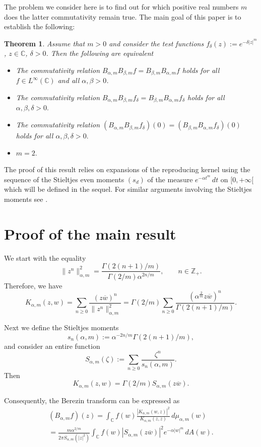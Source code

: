 \documentclass[12pt]{amsart}
\numberwithin{equation}{section}
\newtheorem*{thmA}{Theorem}
\theoremstyle{plain}
\numberwithin{equation}{section}
\begin{document}
 
The problem we consider here is to find out for which positive real numbers $m$ does the latter commutativity remain true.  The main goal of this paper is to establish the following:

\begin{thmA}\label{main}  Assume that $m>0$  and consider the test functions  $f_\delta(z):=e^{-\delta|z|^m}$, $z\in\mathbb C$, $\delta>0$. Then the following are equivalent
\begin{itemize}
\item[(1)] The commutativity  relation   $B_{\alpha,m}B_{\beta,m}f=B_{\beta,m}B_{\alpha,m}f$  holds for all $f\in L^{\infty}(\mathbb C)$ and  all $\alpha, \beta > 0$.
\item[(2)] The commutativity  relation   $B_{\alpha,m}B_{\beta,m}f_\delta =B_{\beta,m}B_{\alpha,m}f_\delta$  holds for all  $\alpha, \beta, \delta >0.$
\item[(3)] The commutativity  relation   $(B_{\alpha,m}B_{\beta,m}f_\delta)(0) =(B_{\beta,m}B_{\alpha,m}f_\delta)(0)$  holds for all $\alpha, \beta, \delta >0.$
\item[(4)] $m=2.$
\end{itemize}
\end{thmA} 

The proof of this result relies on expansions of the reproducing kernel using the sequence of the Stieltjes even moments $(s_d)$ of the measure $ e^{-\alpha t^{m}}\,dt$ on $[0,+\infty[$ which will be defined in the sequel. For similar arguments involving the Stieltjes moments see \cite{BY,CF,SY}.


\section{ Proof of the  main result}

We start with the equality
$$
\|z^n\|^2_{\alpha,m}=\frac{\Gamma(2(n+1)/m)}{\Gamma(2/m)\alpha^{2n/m}},\qquad n\in \mathbb Z_+.
$$
Therefore, we have 
$$ 
K_{\alpha,m}(z,w)=\sum_{n\ge 0}\frac{(z\overline{w})^n}{\|z^n\|^2_{\alpha,m}}=
\Gamma(2/m)
\sum_{n\ge 0}\frac{(\alpha^{\frac{2}{m}}z\overline{w})^{n}}{\Gamma(2(n+1)/m)}.
$$

Next we define the Stieltjes moments
$$
s_n(\alpha,m):= \alpha^{-2n/m}\Gamma(2(n+1)/m),
$$
and consider an entire function
$$
S_{\alpha,m}(\zeta):= \sum_{n\ge0}\frac{\zeta^n}{s_n(\alpha,m)}. 
$$
Then
$$
K_{\alpha,m}(z,w)=\Gamma(2/m)S_{\alpha,m}(z\overline{w}).
$$

Consequently, the Berezin transform can be expressed as 
\begin{multline*}
(B_{\alpha,m}f)(z)=\int_{\mathbb C}f(w)\frac{|K_{\alpha,m}(w,z)|^2}{K_{\alpha,m}(z,z)}\,d\mu_{\alpha,m}(w)\\
 = \frac{m\alpha^{2/m}}{2\pi S_{\alpha,m}(|z|^2)}  \int_{\mathbb C}f(w) |S_{\alpha,m}(z\overline{w})|^2
 e^{-\alpha |w|^m}\,dA(w).
\end{multline*}
\end{document}

